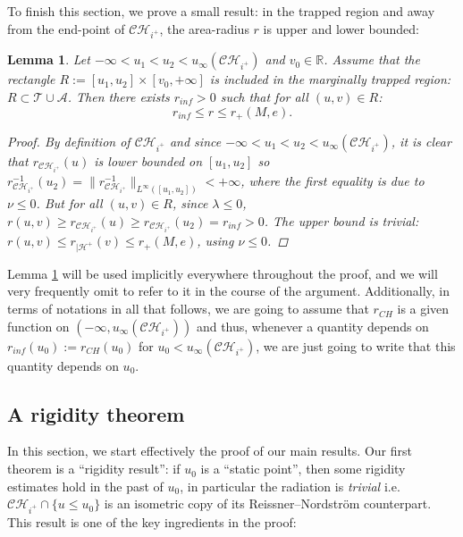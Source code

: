 \documentclass[10pt,a4paper]{article}
\theoremstyle{plain}
\newtheorem{lem}[thm]{Lemma}
\theoremstyle{remark}
\theoremstyle{definition}
\newcommand{\RR}{\mathbb{R}}
\theoremstyle{plain}
\theoremstyle{remark}
\theoremstyle{definition}
\newcommand{\CH}{\mathcal{CH}_{i^+}}
\numberwithin{equation}{section}
\begin{document}
To finish this section, we prove a small result: in the trapped region and away from the end-point of $\CH$, the area-radius $r$ is upper and lower bounded: \begin{lem} \label{easylemma}
	Let $-\infty < u_1 <u_2 < u_{\infty}(\CH)$ and $v_0 \in \RR$. Assume that the rectangle $R:=[u_1,u_2] \times [v_0,+\infty]$ is included in the marginally trapped region: $R \subset \mathcal{T} \cup \mathcal{A} $. Then there exists $r_{inf}>0$  such that for all $(u,v) \in R$: $$  r_{inf}\leq  r \leq r_+(M,e).$$
	
	\begin{proof}
		By definition of $\CH$ and since $-\infty < u_1 <u_2 < u_{\infty}(\CH)$, it is clear that $r_{\CH}(u)$ is lower bounded on $[u_1,u_2]$ so $  r_{\CH}^{-1}(u_2) =\| r^{-1}_{\CH} \|_{ L^{\infty}([u_1,u_2])} < +\infty$, where the first equality is due to $\nu \leq 0$.
		But for all $(u,v) \in R$, since $\lambda \leq 0$, $r(u,v) \geq r_{\CH}(u) \geq r_{\CH}(u_2)=r_{inf}>0$. The upper bound is trivial: $r(u,v) \leq r_{|\mathcal{H}^+}(v) \leq r_+(M,e)$, using $\nu \leq 0$.
	\end{proof}
	
\end{lem}
Lemma \ref{easylemma} will be used implicitly everywhere throughout the proof, and we will very frequently omit to refer to it in the course of the argument. Additionally, in terms of notations in all that follows, we are going to assume that $r_{CH}$ is a given function on $(-\infty,u_{\infty}(\CH))$ and thus, whenever a quantity depends on $r_{inf}(u_0):=r_{CH}(u_0)$ for $u_0 < u_{\infty}(\CH)$, we are just going to write that this quantity depends on $u_0$.
\subsection{A rigidity theorem} \label{rigiditysection}
In this section, we start effectively the proof of our main results. Our first theorem is a ``rigidity result'': if $u_0$ is a ``static point'', then some rigidity estimates hold in the past of $u_0$, in particular the radiation is \textit{trivial} i.e. $\CH \cap \{ u \leq u_0 \}$ is an isometric copy of its Reissner--Nordstr\"{o}m counterpart. This result is one of the key ingredients in the proof:
\end{document}
